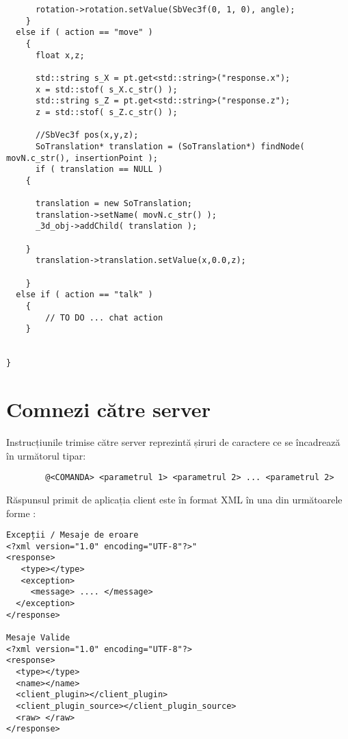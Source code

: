 \begin{verbatim}
      rotation->rotation.setValue(SbVec3f(0, 1, 0), angle);
    }
  else if ( action == "move" )
    {
      float x,z;
      
      std::string s_X = pt.get<std::string>("response.x");
      x = std::stof( s_X.c_str() );
      std::string s_Z = pt.get<std::string>("response.z");
      z = std::stof( s_Z.c_str() );
      
      //SbVec3f pos(x,y,z);
      SoTranslation* translation = (SoTranslation*) findNode( movN.c_str(), insertionPoint );
      if ( translation == NULL )
	{

	  translation = new SoTranslation;
	  translation->setName( movN.c_str() );
	  _3d_obj->addChild( translation );
      
	}
      translation->translation.setValue(x,0.0,z);
    
    }
  else if ( action == "talk" )
    {
		// TO DO ... chat action
    }


}

\end{verbatim}

\section{Comnezi către server}

\par Instrucțiunile trimise către server reprezintă șiruri de caractere ce se încadrează în următorul tipar:
 
\begin{verbatim}
        @<COMANDA> <parametrul 1> <parametrul 2> ... <parametrul 2>
\end{verbatim} 
Răspunsul primit de aplicația client este în format XML în una din următoarele forme :

\begin{verbatim}
Excepții / Mesaje de eroare
<?xml version="1.0" encoding="UTF-8"?>"
<response>
   <type></type>
   <exception>
     <message> .... </message>
  </exception>
</response>

Mesaje Valide
<?xml version="1.0" encoding="UTF-8"?>
<response>
  <type></type>
  <name></name>
  <client_plugin></client_plugin>
  <client_plugin_source></client_plugin_source>
  <raw> </raw>
</response>
\end{verbatim}

